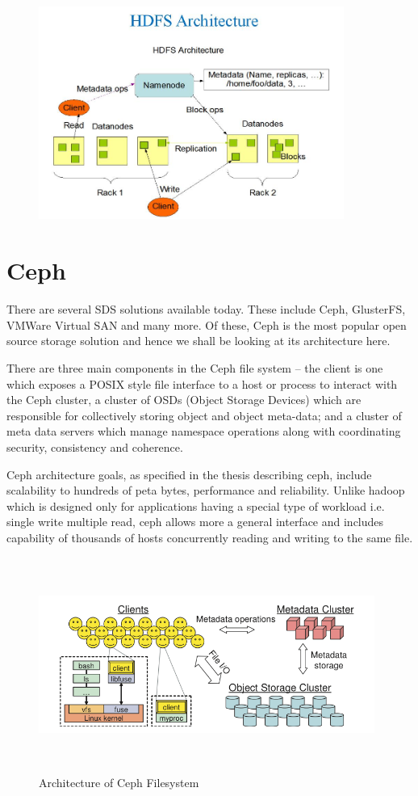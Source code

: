 \documentclass[a4paper,10pt]{article}
\begin{document}
\begin{figure}[!htb]
\centering
\includegraphics[width=10cm,height=7cm]{images/hdfs3}
\end{figure}

\newpage
\section{Ceph }

There are several SDS solutions available today. These include Ceph, GlusterFS, VMWare Virtual SAN and many more. Of these, Ceph is the most popular open source storage solution and hence we shall be looking at its architecture here.

There are three main components in the Ceph file system\cite{weil2006ceph} -- the client is one which exposes a POSIX style file interface to a host or process to interact with the Ceph cluster, a cluster of OSDs (Object Storage Devices) which are responsible for collectively storing object and object meta-data; and a cluster of meta data servers which manage namespace operations along with coordinating security, consistency and coherence.

Ceph architecture goals, as specified in the thesis describing ceph, include scalability to hundreds of peta bytes, performance and reliability. Unlike hadoop which is designed only for applications having a special type of workload i.e. single write multiple read, ceph allows more a general interface and includes capability of thousands of hosts concurrently reading and writing to the same file.


\begin{figure}[!htb]
\centering
\includegraphics[width=11cm,height=7cm]{images/cepharch}
\caption[Long caption]{Architecture of Ceph Filesystem }
\end{figure}
\end{document}
